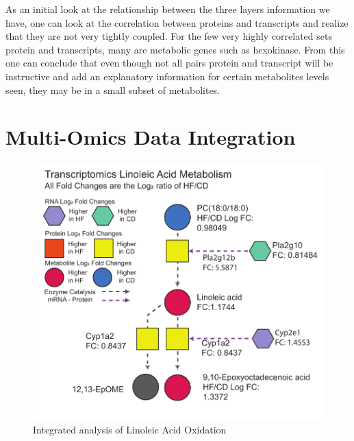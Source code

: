 \documentclass[a4paper,11pt,twoside]{book}
\begin{document}
	As an initial look at the relationship between the three layers information we have, one can look at the correlation between proteins and transcripts and realize that they are not very tightly coupled. For the few very highly correlated sets protein and transcripts, many are metabolic genes such as hexokinase. From this one can conclude that even though not all pairs protein and transcript will be instructive and add an explanatory information for certain metabolites levels seen, they may be in a small subset of metabolites.  
	
	\section{ Multi-Omics Data Integration }

\begin{figure}[hb!]
		\centering
		\includegraphics[width=\linewidth]{3.Trancriptomics/Integrated_Linoic_Acid}
		\caption{Integrated analysis of Linoleic Acid Oxidation}
		\label{fig: Integrated Model of Linoleic Acid Oxidation}
\end{figure}
\end{document}
